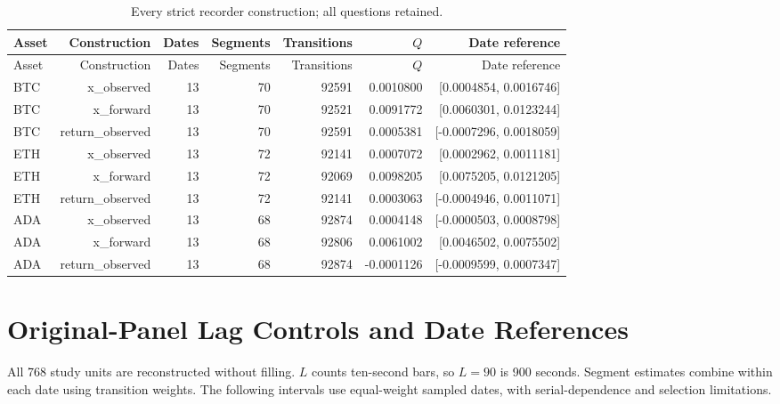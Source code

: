\documentclass[10pt]{article}
\begin{document}
\small\setlength{\tabcolsep}{3pt}
\begin{longtable}{lrrrrrr}
\caption{Every strict recorder construction; all questions retained.}\label{tab:strict_recorder}\\
\toprule
Asset & Construction & Dates & Segments & Transitions & $Q$ & Date reference \\\midrule\endfirsthead
\toprule
Asset & Construction & Dates & Segments & Transitions & $Q$ & Date reference \\\midrule\endhead
BTC & x\_observed & 13 & 70 & 92591 & 0.0010800 & [0.0004854, 0.0016746] \\
BTC & x\_forward & 13 & 70 & 92521 & 0.0091772 & [0.0060301, 0.0123244] \\
BTC & return\_observed & 13 & 70 & 92591 & 0.0005381 & [-0.0007296, 0.0018059] \\
ETH & x\_observed & 13 & 72 & 92141 & 0.0007072 & [0.0002962, 0.0011181] \\
ETH & x\_forward & 13 & 72 & 92069 & 0.0098205 & [0.0075205, 0.0121205] \\
ETH & return\_observed & 13 & 72 & 92141 & 0.0003063 & [-0.0004946, 0.0011071] \\
ADA & x\_observed & 13 & 68 & 92874 & 0.0004148 & [-0.0000503, 0.0008798] \\
ADA & x\_forward & 13 & 68 & 92806 & 0.0061002 & [0.0046502, 0.0075502] \\
ADA & return\_observed & 13 & 68 & 92874 & -0.0001126 & [-0.0009599, 0.0007347] \\
\bottomrule\end{longtable}\normalsize

\section{Original-Panel Lag Controls and Date References}
All 768 study units are reconstructed without filling. $L$ counts ten-second bars, so $L=90$ is 900 seconds. Segment estimates combine within each date using transition weights. The following intervals use equal-weight sampled dates, with serial-dependence and selection limitations.
\end{document}

